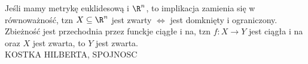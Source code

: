 \documentclass{article}
\begin{document}
Jeśli mamy metrykę euklidesową i $\R^n$, to implikacja zamienia się w równoważność, tzn $X\subseteq \R^n$ jest zwarty $\iff$ jest domknięty i ograniczony.\bigskip\\
Zbieżność jest przechodnia przez funckje ciągłe i na, tzn $f:X\to Y$ jest ciągła i na oraz $X$ jest zwarta, to $Y$ jest zwarta.\bigskip\\
KOSTKA HILBERTA, SPOJNOSC

\section{}
\end{document}
